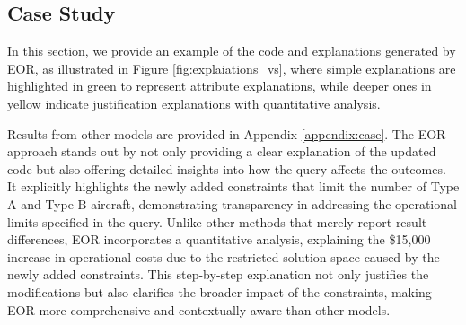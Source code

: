 \subsection{Case Study}

In this section, we provide an example of the code and explanations generated by EOR, as illustrated in Figure \ref{fig:explaiations_vs}, where simple explanations are highlighted in green to represent attribute explanations, while deeper ones in yellow indicate justification explanations with quantitative analysis.

Results from other models are provided in Appendix \ref{appendix:case}. The EOR approach stands out by not only providing a clear explanation of the updated code but also offering detailed insights into how the query affects the outcomes. It explicitly highlights the newly added constraints that limit the number of Type A and Type B aircraft, demonstrating transparency in addressing the operational limits specified in the query. Unlike other methods that merely report result differences, EOR incorporates a quantitative analysis, explaining the \$15,000 increase in operational costs due to the restricted solution space caused by the newly added constraints. This step-by-step explanation not only justifies the modifications but also clarifies the broader impact of the constraints, making EOR more comprehensive and contextually aware than other models.

